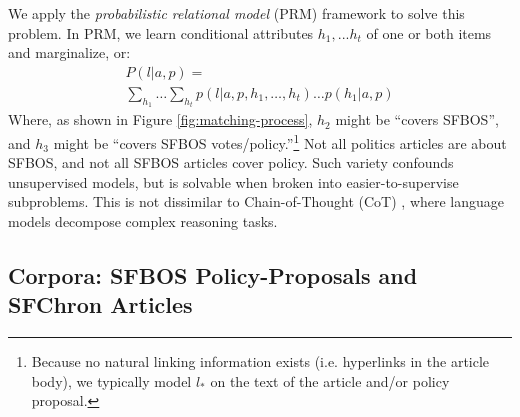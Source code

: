 \documentclass[11pt]{article}
\begin{document}
We apply the \textit{probabilistic relational model} (PRM) framework \cite{getoor2002learning} to solve this problem. In PRM, we learn conditional attributes  $h_1, ... h_t$ of one or both items and marginalize, or:
\begin{equation}
\begin{split}
    P( l | a, p ) = \\ 
    \sum_{h_1} \ldots \sum_{h_t} p(l | a, p, h_1, \ldots,  h_t) \ldots p( h_1 | a, p )
\label{eq:factorized-link}
\end{split}
\end{equation}
Where, as shown in Figure \ref{fig:matching-process}, $h_2$ might be ``covers SFBOS'', and $h_3$ might be ``covers SFBOS votes/policy.''\footnote{Because no natural linking information exists (i.e. hyperlinks in the article body), we typically model $l_*$ on the text of the article and/or policy proposal.} Not all politics articles are about SFBOS, and not all SFBOS articles cover policy. Such variety confounds unsupervised models, but is solvable when broken into easier-to-supervise subproblems. This is not dissimilar to Chain-of-Thought (CoT) \cite{wei2022chain}, where language models decompose complex reasoning tasks. %
%
%
%

\subsection{Corpora: SFBOS Policy-Proposals and SFChron Articles}
\label{sct:sct-1:dataset}
\end{document}
